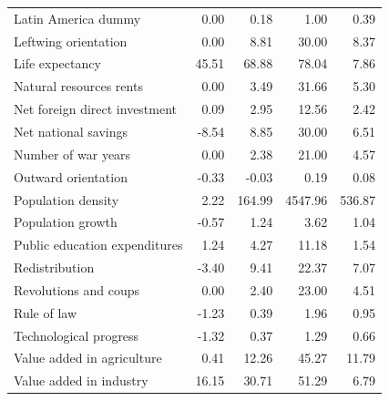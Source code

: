 \begin{refsection}
\begin{subappendices}
\begin{table}[!ht]
\begin{tabular}{lrrrr}
      Latin America dummy & 0.00 & 0.18 & 1.00 & 0.39 \\ 
      Leftwing orientation & 0.00 & 8.81 & 30.00 & 8.37 \\ 
      Life expectancy & 45.51 & 68.88 & 78.04 & 7.86 \\ 
      Natural resources rents & 0.00 & 3.49 & 31.66 & 5.30 \\ 
      Net foreign direct investment & 0.09 & 2.95 & 12.56 & 2.42 \\ 
      Net national savings & -8.54 & 8.85 & 30.00 & 6.51 \\ 
      Number of war years & 0.00 & 2.38 & 21.00 & 4.57 \\ 
      Outward orientation & -0.33 & -0.03 & 0.19 & 0.08 \\ 
      Population density & 2.22 & 164.99 & 4547.96 & 536.87 \\ 
      Population growth & -0.57 & 1.24 & 3.62 & 1.04 \\ 
      Public education expenditures & 1.24 & 4.27 & 11.18 & 1.54 \\ 
      Redistribution & -3.40 & 9.41 & 22.37 & 7.07 \\ 
      Revolutions and coups & 0.00 & 2.40 & 23.00 & 4.51 \\ 
      Rule of law & -1.23 & 0.39 & 1.96 & 0.95 \\ 
      Technological progress & -1.32 & 0.37 & 1.29 & 0.66 \\ 
      Value added in agriculture & 0.41 & 12.26 & 45.27 & 11.79 \\ 
      Value added in industry & 16.15 & 30.71 & 51.29 & 6.79 \\
       \bottomrule
    \end{tabular}
    \end{table}
    \clearpage
    
    

\end{subappendices}
\end{refsection}
